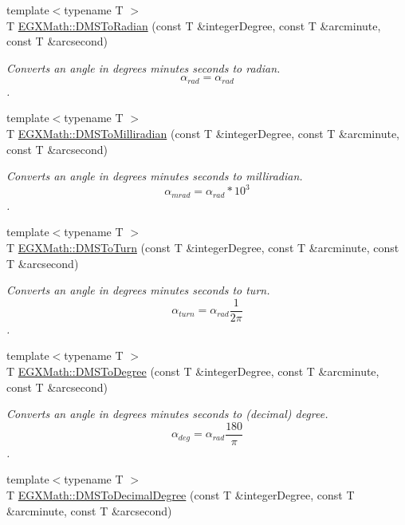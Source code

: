 \begin{DoxyCompactItemize}
\item 
{\footnotesize template$<$typename T $>$ }\\T \mbox{\hyperlink{group___e_g_x_math-_angle_conversions-_d_m_s_gaf87ebf95727895ba81084a2246e93211}{E\+G\+X\+Math\+::\+D\+M\+S\+To\+Radian}} (const T \&integer\+Degree, const T \&arcminute, const T \&arcsecond)
\begin{DoxyCompactList}\small\item\em Converts an angle in degrees minutes seconds to radian. \[\alpha_{rad}=\alpha_{rad}\]. \end{DoxyCompactList}\item 
{\footnotesize template$<$typename T $>$ }\\T \mbox{\hyperlink{group___e_g_x_math-_angle_conversions-_d_m_s_ga64258049da06b11e8ec77108ea80de82}{E\+G\+X\+Math\+::\+D\+M\+S\+To\+Milliradian}} (const T \&integer\+Degree, const T \&arcminute, const T \&arcsecond)
\begin{DoxyCompactList}\small\item\em Converts an angle in degrees minutes seconds to milliradian. \[\alpha_{mrad}=\alpha_{rad}*10^3\]. \end{DoxyCompactList}\item 
{\footnotesize template$<$typename T $>$ }\\T \mbox{\hyperlink{group___e_g_x_math-_angle_conversions-_d_m_s_ga9ed22b7d1d3bafe2ee8e4c81510a77fa}{E\+G\+X\+Math\+::\+D\+M\+S\+To\+Turn}} (const T \&integer\+Degree, const T \&arcminute, const T \&arcsecond)
\begin{DoxyCompactList}\small\item\em Converts an angle in degrees minutes seconds to turn. \[\alpha_{turn}=\alpha_{rad}\frac{1}{2 \pi}\]. \end{DoxyCompactList}\item 
{\footnotesize template$<$typename T $>$ }\\T \mbox{\hyperlink{group___e_g_x_math-_angle_conversions-_d_m_s_ga3744d5ef737f693a191efc151d8ef3f3}{E\+G\+X\+Math\+::\+D\+M\+S\+To\+Degree}} (const T \&integer\+Degree, const T \&arcminute, const T \&arcsecond)
\begin{DoxyCompactList}\small\item\em Converts an angle in degrees minutes seconds to (decimal) degree. \[\alpha_{deg}=\alpha_{rad}\frac{180}{\pi}\]. \end{DoxyCompactList}\item 
{\footnotesize template$<$typename T $>$ }\\T \mbox{\hyperlink{group___e_g_x_math-_angle_conversions-_d_m_s_ga10e325fbb65f6e2e7d8cd7d3d8af2931}{E\+G\+X\+Math\+::\+D\+M\+S\+To\+Decimal\+Degree}} (const T \&integer\+Degree, const T \&arcminute, const T \&arcsecond)

\end{DoxyCompactItemize}
